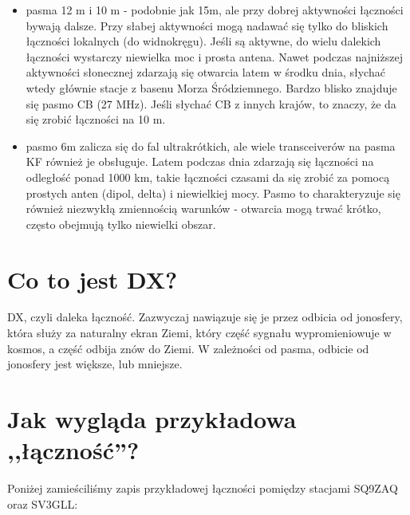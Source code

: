 \documentclass[a4paper,12pt]{article}
\begin{document}
\begin{itemize}
 \item pasma 12 m i 10 m - podobnie jak 15m, ale przy dobrej aktywności łączności bywają dalsze. Przy słabej aktywności mogą nadawać się tylko do bliskich łączności lokalnych (do widnokręgu). Jeśli są aktywne, do wielu dalekich łączności wystarczy niewielka moc i prosta antena. Nawet podczas najniższej aktywności słonecznej zdarzają się otwarcia latem w środku dnia, słychać wtedy głównie stacje z basenu Morza Śródziemnego. Bardzo blisko znajduje się pasmo CB (27 MHz). Jeśli słychać CB z innych krajów, to znaczy, że da się zrobić łączności na 10 m.
 \item pasmo 6m zalicza się do fal ultrakrótkich, ale wiele transceiverów na pasma KF również je obsługuje. Latem podczas dnia zdarzają się łączności na odległość ponad 1000 km, takie łączności czasami da się zrobić za pomocą prostych anten (dipol, delta) i niewielkiej mocy. Pasmo to charakteryzuje się również niezwykłą zmiennością warunków - otwarcia mogą trwać krótko, często obejmują tylko niewielki obszar.
\end{itemize}


\section{Co to jest DX?}
DX, czyli daleka łączność. Zazwyczaj nawiązuje się je przez odbicia od jonosfery, która służy za naturalny ekran Ziemi, który część sygnału wypromieniowuje w kosmos, a część odbija znów do Ziemi. W zależności od pasma, odbicie od jonosfery jest większe, lub mniejsze.

\section{Jak wygląda przykładowa ,,łączność''?}
Poniżej zamieściliśmy zapis przykładowej łączności pomiędzy stacjami SQ9ZAQ oraz SV3GLL:
\end{document}
